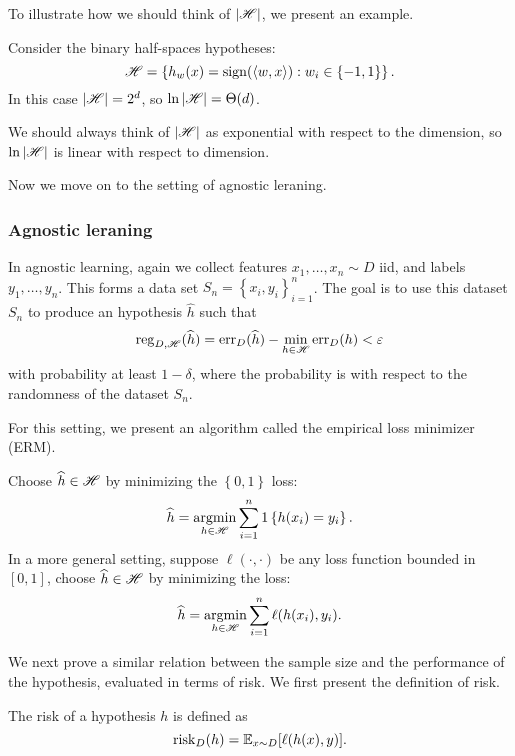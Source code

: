 \documentclass[a4paper]{article}
\begin{document}
To illustrate how we should think of $\left\lvert \mathscr{H}\right\rvert$, 
we present an example.
\begin{eg}
Consider the binary half-spaces hypotheses: 
\[
\mathscr{H} = \left\{ h_w(x) = \operatorname{sign}(\left\langle w, x \right\rangle) : 
w_i \in \left\{ -1, 1 \right\} \right\}.
\]
In this case $\left\lvert \mathscr{H}\right\rvert = 2^d$, so $\ln \left\lvert \mathscr{H}\right\rvert = 
\Theta(d)$. 

We should always think of $\left\lvert \mathscr{H}\right\rvert$
as exponential with respect to the dimension, so 
$\ln \left\lvert \mathscr{H}\right\rvert$ is linear with respect to dimension.
\end{eg}

Now we move on to the setting of agnostic leraning.

\subsubsection{Agnostic leraning}

In agnostic learning, again we collect features $x_1, \dots,
x_n \sim D$ iid, and labels $y_1, \dots, y_n$. This forms a 
data set $S_n = \left\{ x_i, y_i \right\}_{i=1}^n$. The 
goal is to use this dataset $S_n$ to produce an hypothesis 
$\hat{h}$ such that 
\[
\operatorname{reg}_{D, \mathscr{H}} (\widehat{h}) = 
\operatorname{err}_D (\widehat{h}) - \min_{h \in \mathscr{H}} \operatorname{err}_D (h) < \varepsilon
\]
with probability at least $1 - \delta$, where the probability
is with respect to the randomness of the dataset $S_n$.

For this setting, we present an algorithm called the empirical 
loss minimizer (ERM). 
\begin{algorithm}
  Choose $\widehat{h} \in \mathscr{H}$ by minimizing the $\left\{ 0,1
   \right\}$ loss:
  \[
  \widehat{h} = \operatorname*{argmin}_{h \in \mathscr{H}} \sum_{i=1}^n 1 \left\{ 
    h(x_i) = y_i
   \right\}.
  \]
  In a more general setting, suppose $\ell(\cdot, \cdot)$ 
  be any loss function bounded in $[0, 1]$, choose 
  $\widehat{h} \in \mathscr{H}$ by minimizing the loss:
  \[
  \widehat{h} = \operatorname*{argmin}_{h \in \mathscr{H}} \sum_{i=1}^n \ell(h(x_i), 
  y_i).
  \] 
\end{algorithm}

We next prove a similar relation between the sample 
size and the performance of the hypothesis, evaluated 
in terms of risk. We first present the definition 
of risk.

\begin{defi}[Risk]
  The risk of a hypothesis $h$ is defined as 
  \[
  \operatorname{risk}_D (h) = \mathbb{E}_{x \sim D} [ \ell(h(x), y) ].
  \]
\end{defi}
\end{document}
